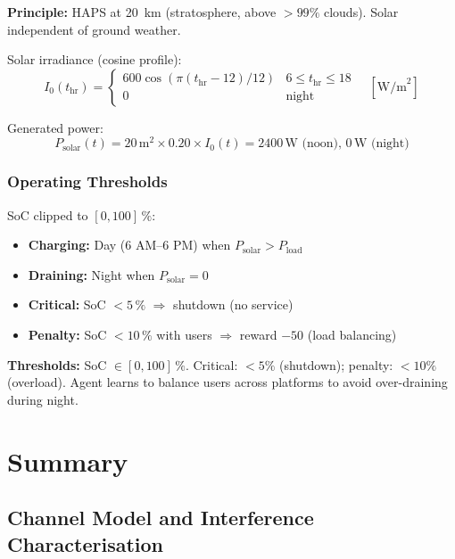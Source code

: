 \documentclass[conference]{IEEEtran}
\begin{document}
\textbf{Principle:} HAPS at 20~km (stratosphere, above $>99\%$ clouds). Solar independent of ground weather.

\noindent Solar irradiance (cosine profile):
\begin{equation}
I_0(t_{\text{hr}}) = \begin{cases}
600 \cos(\pi(t_{\text{hr}} - 12)/12) & 6 \le t_{\text{hr}} \le 18 \\
0 & \text{night}
\end{cases} \quad [\text{W/m}^2]
\end{equation}

\noindent Generated power:
\begin{equation}
P_{\text{solar}}(t) = 20\,\text{m}^2 \times 0.20 \times I_0(t) = 2400\,\text{W (noon)}, \, 0\,\text{W (night)}
\end{equation}

\subsubsection{Operating Thresholds}

SoC clipped to $[0, 100]\,\%$:
\begin{itemize}\setlength{\itemsep}{2pt}
  \item \textbf{Charging:} Day (6 AM--6 PM) when $P_{\text{solar}} > P_{\text{load}}$
  \item \textbf{Draining:} Night when $P_{\text{solar}} = 0$
  \item \textbf{Critical:} SoC $< 5\,\%$ $\Rightarrow$ shutdown (no service)
  \item \textbf{Penalty:} SoC $< 10\,\%$ with users $\Rightarrow$ reward $-50$ (load balancing)
\end{itemize}

\textbf{Thresholds:} SoC $\in [0,100]\,\%$. Critical: $< 5\%$ (shutdown); penalty: $< 10\%$ (overload). Agent learns to balance users across platforms to avoid over-draining during night.

\FloatBarrier

\section{Summary}

\subsection{Channel Model and Interference Characterisation}
\label{sec:channel-model-summary}
\end{document}

